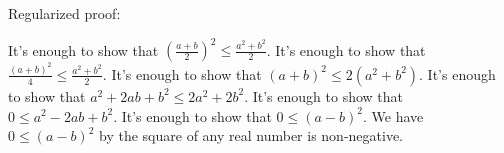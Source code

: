 \documentclass{article}
\begin{document}
Regularized proof:
\begin{tcolorbox}[colback=red!10, width=\linewidth]
It's enough to show that $\left(\frac{a+b}{2}\right)^2 \leq \frac{a^2+b^2}{2}$.
It's enough to show that $\frac{(a+b)^2}{4} \leq \frac{a^2+b^2}{2}$.
It's enough to show that $(a+b)^2 \leq 2(a^2+b^2)$.
It's enough to show that $a^2+2ab+b^2 \leq 2a^2+2b^2$.
It's enough to show that $0 \leq a^2-2ab+b^2$.
It's enough to show that $0 \leq (a-b)^2$.
We have $0 \leq (a-b)^2$ by the square of any real number is non-negative.
\end{tcolorbox}
\end{document}
